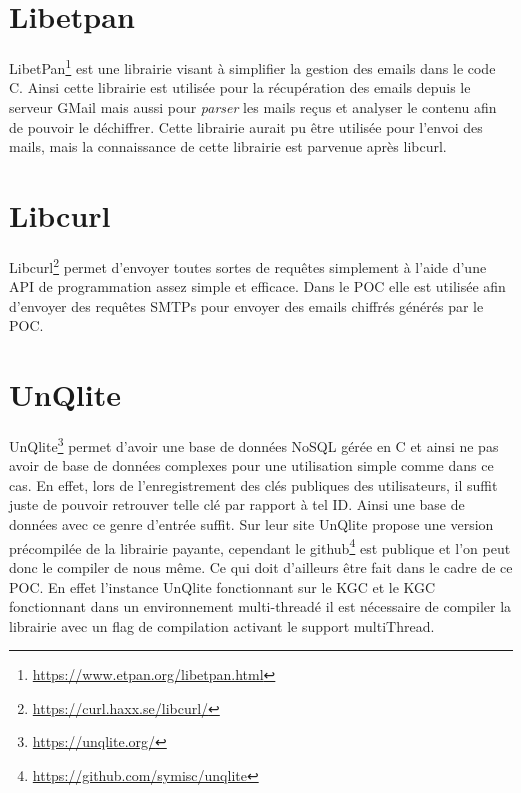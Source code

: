 \section{Libetpan}
LibetPan\footnote{\url{https://www.etpan.org/libetpan.html}} est une librairie visant à simplifier la gestion des emails dans le code C. Ainsi cette librairie est utilisée pour la récupération des emails depuis le serveur GMail mais aussi pour \textit{parser} les mails reçus et analyser le contenu afin de pouvoir le déchiffrer. Cette librairie aurait pu être utilisée pour l'envoi des mails, mais la connaissance de cette librairie est parvenue après libcurl.
\section{Libcurl}
Libcurl\footnote{\url{https://curl.haxx.se/libcurl/}} permet d'envoyer toutes sortes de requêtes simplement à l'aide d'une API de programmation assez simple et efficace. Dans le POC elle est utilisée afin d'envoyer des requêtes SMTPs pour envoyer des emails chiffrés générés par le POC.
\section{UnQlite}
UnQlite\footnote{\url{https://unqlite.org/}} permet d'avoir une base de données NoSQL gérée en C et ainsi ne pas avoir de base de données complexes pour une utilisation simple comme dans ce cas. En effet, lors de l'enregistrement des clés publiques des utilisateurs, il suffit juste de pouvoir retrouver telle clé par rapport à tel ID. Ainsi une base de données avec ce genre d'entrée suffit. Sur leur site UnQlite propose une version précompilée de la librairie payante, cependant le github\footnote{\url{https://github.com/symisc/unqlite}} est publique et l'on peut donc le compiler de nous même. Ce qui doit d'ailleurs être fait dans le cadre de ce POC. En effet l'instance UnQlite fonctionnant sur le KGC et le KGC fonctionnant dans un environnement multi-threadé il est nécessaire de compiler la librairie avec un flag de compilation activant le support multiThread.